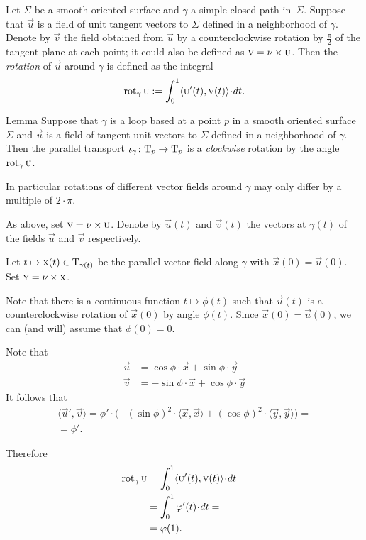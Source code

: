 Let $\Sigma$ be a smooth oriented surface and $\gamma$ a simple closed path in~$\Sigma$.
Suppose that $\vec u$ is a field of unit tangent vectors to $\Sigma$ defined in a neighborhood of $\gamma$.
Denote by $\vec v$ the field obtained from $\vec u$ by a counterclockwise rotation by $\tfrac{\pi}2$ of the tangent plane at each point; it could also be defined as $\text{\sc{v}}=\nu\times\text{\sc{u}}$.
Then the \emph{rotation} of $\vec u$ around $\gamma$ is defined as the integral
\[\rot_\gamma\vec u
\df
\int_0^1\langle\vec u'(t),\vec v(t)\rangle\cdot dt.\]

\begin{thm}{Lemma}\label{lem:rotation-parallel}
Suppose that $\gamma$ is a loop based at a point $p$ in a smooth oriented surface $\Sigma$ and $\vec u$ is a field of tangent unit vectors to $\Sigma$ defined in a neighborhood of $\gamma$.
Then the parallel transport $\iota_\gamma\colon\mathrm{T}_p\to\mathrm{T}_p$ is a {}\emph{clockwise} rotation by the angle $\mathop{\rm rot}\nolimits_\gamma\text{\sc{u}}$.

In particular rotations of different vector fields around $\gamma$ may only differ by a multiple of $2\cdot\pi$.
\end{thm}

As above, set $\text{\sc{v}}=\nu\times\text{\sc{u}}$. 
Denote by $\vec u(t)$ and $\vec v(t)$ the vectors at $\gamma(t)$ of the fields $\vec u$ and $\vec v$ respectively.

Let $t\mapsto \text{\sc{x}}(t)\in \mathrm{T}_{\gamma(t)}$ be the parallel vector field along $\gamma$ with  $\vec x(0)=\vec u(0)$.
Set $\text{\sc{y}}=\nu\times\text{\sc{x}}$.

Note that there is a continuous function $t\mapsto \phi(t)$ such that 
$\vec u(t)$ is a counterclockwise rotation of $\vec x(0)$ by angle $\phi(t)$.
Since $\vec x(0)=\vec u(0)$, we can (and will) assume that $\phi(0)=0$.

Note that
\begin{align*}
\vec u&=\cos\phi\cdot \vec x+\sin\phi\cdot \vec y
\\
\vec v&=-\sin\phi\cdot \vec x+\cos\phi\cdot \vec y
\end{align*}
It follows that 
\begin{align*}
\langle\vec u',\vec v\rangle
=\phi'\cdot\biggl(&(\sin \phi)^2\cdot \langle\vec x,\vec x\rangle+(\cos \phi)^2\cdot \langle\vec y,\vec y\rangle
\biggr)=
\\
=\phi'.\ &
\end{align*}

Therefore
\begin{align*}
\rot_\gamma\vec u&=\int_0^1\langle\vec u'(t),\vec v(t)\rangle\cdot dt=
\\
&=\int_0^1\phi'(t)\cdot dt=
\\
&=\phi(1).
\end{align*}

